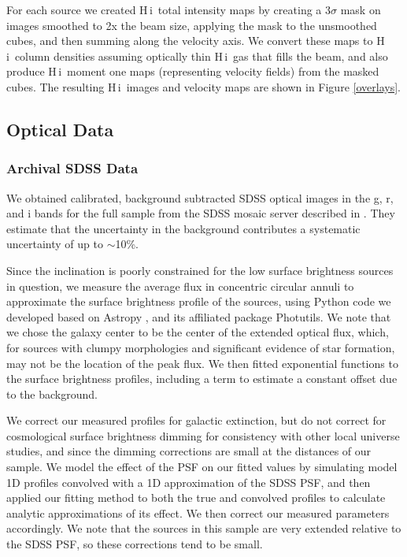 \documentclass[twocolumn]{aastex6}
\newcommand{\hi}{H{\sc\,i}}
\begin{document}
For each source we created \hi\ total intensity maps by creating a 3$\sigma$ mask on images smoothed to 2x the beam
size, applying the mask to the unsmoothed cubes, and then summing along the velocity axis. We convert these maps to \hi\ column densities assuming optically thin \hi\ gas that fills the beam, %
and also produce \hi\ moment one maps (representing velocity fields) from the masked cubes.
The resulting \hi\ images and velocity maps are shown in Figure \ref{overlays}. 

\subsection{Optical Data}
\label{data.opt}

\subsubsection{Archival SDSS Data}
\label{data.opt.sdss}

We obtained calibrated, background subtracted SDSS optical images in the g, r, and i bands for the full sample from the SDSS mosaic server described in \cite{blanton11a}. They estimate that the uncertainty in the background contributes a systematic uncertainty of up to $\sim$10\%.  

Since the inclination is poorly constrained for the low surface brightness sources in question, we measure the average flux in concentric circular annuli to approximate the surface brightness profile of the sources, using Python code we developed based on Astropy \citep{astropy13a}, and its affiliated package Photutils. We note that we chose the galaxy center to be the center of the extended optical flux, which, for sources with clumpy morphologies and significant evidence of star formation, may not be the location of the peak flux. We then fitted exponential functions to the surface brightness profiles, including a term to estimate a constant offset due to the background. 

We correct our measured profiles for galactic extinction, but do not correct for cosmological surface brightness dimming for consistency with other local universe studies, and since the dimming corrections are small at the distances of our sample. We model the effect of the PSF on our fitted values by simulating model 1D profiles convolved with a 1D approximation of the SDSS PSF, and then applied our fitting method to both the true and convolved profiles to calculate analytic approximations of its effect. We then correct our measured parameters accordingly. We note that the sources in this sample are very extended relative to the SDSS PSF, so these corrections tend to be small.
\end{document}
